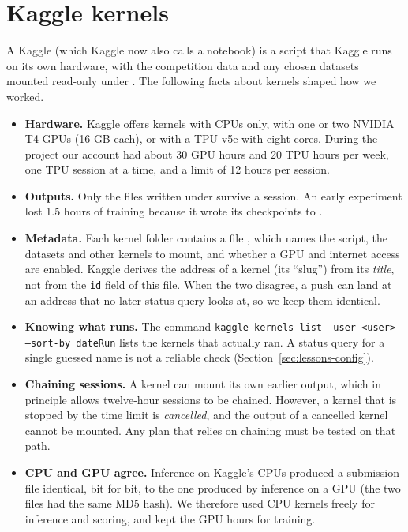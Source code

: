 \section{Kaggle kernels}\label{sec:infra-kaggle}
A Kaggle  (which Kaggle now also calls a notebook) is a script that Kaggle runs on its
own hardware, with the competition data and any chosen datasets mounted read-only under
. The following facts about kernels shaped how we worked.
\begin{itemize}[leftmargin=*,itemsep=2pt]
\item \textbf{Hardware.} Kaggle offers kernels with CPUs only, with one or two NVIDIA T4 GPUs (16 GB
each), or with a TPU v5e with eight cores. During the project our account had about 30 GPU hours and
20 TPU hours per week, one TPU session at a time, and a limit of 12 hours per session.
\item \textbf{Outputs.} Only the files written under  survive a session. An early
experiment lost 1.5 hours of training because it wrote its checkpoints to .
\item \textbf{Metadata.} Each kernel folder contains a file , which names
the script, the datasets and other kernels to mount, and whether a GPU and internet access are enabled.
Kaggle derives the address of a kernel (its ``slug'') from its \emph{title}, not from the \texttt{id}
field of this file. When the two disagree, a push can land at an address that no later status query
looks at, so we keep them identical.
\item \textbf{Knowing what runs.} The command \texttt{kaggle kernels list --user <user> --sort-by
dateRun} lists the kernels that actually ran. A status query for a single guessed name is not a
reliable check (Section~\ref{sec:lessons-config}).
\item \textbf{Chaining sessions.} A kernel can mount its own earlier output, which in principle allows
twelve-hour sessions to be chained. However, a kernel that is stopped by the time limit is
\emph{cancelled}, and the output of a cancelled kernel cannot be mounted. Any plan that relies on
chaining must be tested on that path.
\item \textbf{CPU and GPU agree.} Inference on Kaggle's CPUs produced a submission file identical, bit
for bit, to the one produced by inference on a GPU (the two files had the same MD5 hash). We therefore
used CPU kernels freely for inference and scoring, and kept the GPU hours for training.
\end{itemize}


